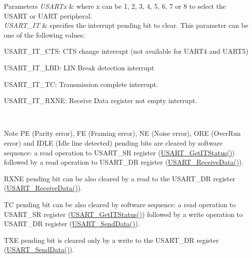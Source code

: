 \begin{DoxyParams}{Parameters}
{\em U\+S\+A\+R\+Tx} & where x can be 1, 2, 3, 4, 5, 6, 7 or 8 to select the U\+S\+A\+RT or U\+A\+RT peripheral. \\
\hline
{\em U\+S\+A\+R\+T\+\_\+\+IT} & specifies the interrupt pending bit to clear. This parameter can be one of the following values\+: \begin{DoxyItemize}
\item U\+S\+A\+R\+T\+\_\+\+I\+T\+\_\+\+C\+TS\+: C\+TS change interrupt (not available for U\+A\+R\+T4 and U\+A\+R\+T5) \item U\+S\+A\+R\+T\+\_\+\+I\+T\+\_\+\+L\+BD\+: L\+IN Break detection interrupt \item U\+S\+A\+R\+T\+\_\+\+I\+T\+\_\+\+TC\+: Transmission complete interrupt. \item U\+S\+A\+R\+T\+\_\+\+I\+T\+\_\+\+R\+X\+NE\+: Receive Data register not empty interrupt.\end{DoxyItemize}
\\
\hline
\end{DoxyParams}
\begin{DoxyNote}{Note}
PE (Parity error), FE (Framing error), NE (Noise error), O\+RE (Over\+Run error) and I\+D\+LE (Idle line detected) pending bits are cleared by software sequence\+: a read operation to U\+S\+A\+R\+T\+\_\+\+SR register (\mbox{\hyperlink{group___u_s_a_r_t___group9_ga93d8f031241bcdbe938d091a85295445}{U\+S\+A\+R\+T\+\_\+\+Get\+I\+T\+Status()}}) followed by a read operation to U\+S\+A\+R\+T\+\_\+\+DR register (\mbox{\hyperlink{group___u_s_a_r_t___group2_gac67a91845b0b1d54d31bdfb1c5e9867c}{U\+S\+A\+R\+T\+\_\+\+Receive\+Data()}}). 

R\+X\+NE pending bit can be also cleared by a read to the U\+S\+A\+R\+T\+\_\+\+DR register (\mbox{\hyperlink{group___u_s_a_r_t___group2_gac67a91845b0b1d54d31bdfb1c5e9867c}{U\+S\+A\+R\+T\+\_\+\+Receive\+Data()}}). 

TC pending bit can be also cleared by software sequence\+: a read operation to U\+S\+A\+R\+T\+\_\+\+SR register (\mbox{\hyperlink{group___u_s_a_r_t___group9_ga93d8f031241bcdbe938d091a85295445}{U\+S\+A\+R\+T\+\_\+\+Get\+I\+T\+Status()}}) followed by a write operation to U\+S\+A\+R\+T\+\_\+\+DR register (\mbox{\hyperlink{group___u_s_a_r_t___group2_ga0b43d42da9540f446d494bf69823c6fb}{U\+S\+A\+R\+T\+\_\+\+Send\+Data()}}). 

T\+XE pending bit is cleared only by a write to the U\+S\+A\+R\+T\+\_\+\+DR register (\mbox{\hyperlink{group___u_s_a_r_t___group2_ga0b43d42da9540f446d494bf69823c6fb}{U\+S\+A\+R\+T\+\_\+\+Send\+Data()}}).
\end{DoxyNote}

